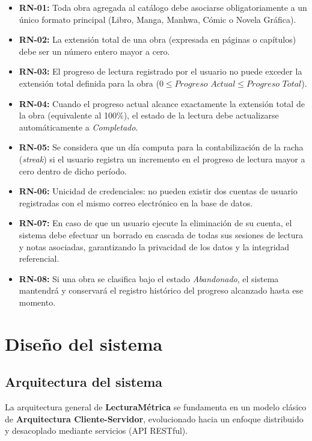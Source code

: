 \documentclass[12pt, atypical, journal]{article}
\begin{document}
\begin{itemize}
	\item \textbf{RN-01:} Toda obra agregada al catálogo debe asociarse obligatoriamente a un único formato principal (Libro, Manga, Manhwa, Cómic o Novela Gráfica).
	\item \textbf{RN-02:} La extensión total de una obra (expresada en páginas o capítulos) debe ser un número entero mayor a cero.
	\item \textbf{RN-03:} El progreso de lectura registrado por el usuario no puede exceder la extensión total definida para la obra ($0 \le \textit{Progreso Actual} \le \textit{Progreso Total}$).
	\item \textbf{RN-04:} Cuando el progreso actual alcance exactamente la extensión total de la obra (equivalente al 100\%), el estado de la lectura debe actualizarse automáticamente a \textit{Completado}.
	\item \textbf{RN-05:} Se considera que un día computa para la contabilización de la racha (\textit{streak}) si el usuario registra un incremento en el progreso de lectura mayor a cero dentro de dicho período.
	\item \textbf{RN-06:} Unicidad de credenciales: no pueden existir dos cuentas de usuario registradas con el mismo correo electrónico en la base de datos.
	\item \textbf{RN-07:} En caso de que un usuario ejecute la eliminación de su cuenta, el sistema debe efectuar un borrado en cascada de todas sus sesiones de lectura y notas asociadas, garantizando la privacidad de los datos y la integridad referencial.
	\item \textbf{RN-08:} Si una obra se clasifica bajo el estado \textit{Abandonado}, el sistema mantendrá y conservará el registro histórico del progreso alcanzado hasta ese momento.
\end{itemize}

\newpage

\section{Diseño del sistema}

\subsection{Arquitectura del sistema}
La arquitectura general de \textbf{LecturaMétrica} se fundamenta en un modelo clásico de \textbf{Arquitectura Cliente-Servidor}, evolucionado hacia un enfoque distribuido y desacoplado mediante servicios (API RESTful).
\end{document}
